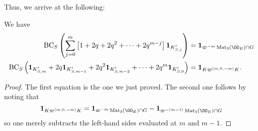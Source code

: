 Thus, we arrive at the following:
\begin{proposition}
  We have
  \begin{align*}
    \BC_S \left(
    \sum_{j=0}^m \left[ 1 + 2q + 2q^2 + \dots + 2q^{m-j} \right]
    \mathbf{1}_{K'_{S,j}} \right)
    &= \mathbf{1}_{\varpi^{-m} \Mat_3(\OO_E) \cap G} \\
    \BC_S \left(
    \mathbf{1}_{K'_{S,m}}
    + 2q \mathbf{1}_{K'_{S,m-1}}
    + 2q^2 \mathbf{1}_{K'_{S,m-2}}
    + \dots
    + 2q^m \mathbf{1}_{K'_{S,0}} \right)
    &= \mathbf{1}_{K\varpi^{(m,0,-m)}K}.
  \end{align*}
\end{proposition}
\begin{proof}
  The first equation is the one we just proved.
  The second one follows by noting that
  \[
    \mathbf{1}_{K\varpi^{(m,0,-m)}K}
    = \mathbf{1}_{\varpi^{-m} \Mat_3(\OO_E) \cap G}
    - \mathbf{1}_{\varpi^{-(m-1)} \Mat_3(\OO_E) \cap G}
  \]
  so one merely subtracts the left-hand sides evaluated at $m$ and $m-1$.
\end{proof}
